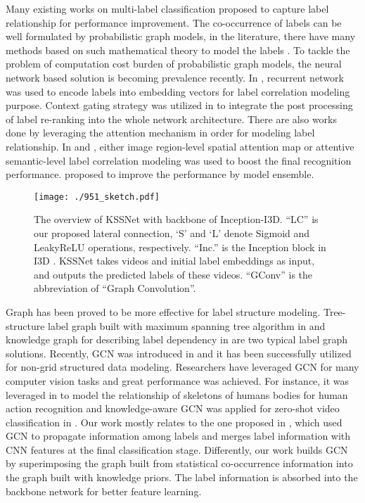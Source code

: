 \documentclass[letterpaper]{article} \usepackage{aaai20}  \usepackage{times}  \usepackage{helvet} \usepackage{courier}  \usepackage[hyphens]{url}  \usepackage{graphicx} \usepackage{subfigure}
\begin{document}
Many existing works on multi-label classification proposed to capture label relationship for performance improvement.
The co-occurrence of labels can be well formulated by probabilistic graph models, in the literature, there have many methods based on such mathematical theory to model the labels \cite{li2016conditional,li2014multi}. To tackle the problem of computation cost burden of probabilistic graph models, the neural network based solution is becoming prevalence recently.
In \cite{wang2016cnn}, recurrent network was used to encode labels into embedding vectors for label correlation modeling purpose. Context gating strategy was utilized in \cite{lin2018nextvlad} to integrate the post processing of label re-ranking into the whole network architecture. There are also works done by leveraging the attention mechanism in order for modeling label relationship. In \cite{wang2017multi} and \cite{zhu2017learning}, either image region-level spatial attention map or attentive semantic-level label correlation modeling was used to boost the final recognition performance. \cite{wang2019baseline} proposed to improve the performance by model ensemble.

\begin{figure*}[!t]
	\centering
	\texttt{[image: ./951\_sketch.pdf]}
	\caption{The overview of KSSNet with backbone of Inception-I3D. ``LC'' is our proposed lateral connection, `S' and `L' denote Sigmoid and LeakyReLU operations, respectively. ``Inc.'' is the Inception block in I3D \cite{carreira2017quo}. KSSNet takes videos and initial label embeddings as input, and outputs the predicted labels of these videos. ``GConv'' is the abbreviation of ``Graph Convolution''.}
	\label{sketch}
  \end{figure*}
Graph has been proved to be more effective for label structure modeling. Tree-structure label graph built with maximum spanning tree algorithm in \cite{li2014multi} and knowledge graph for describing label dependency in \cite{lee2018multi} are two typical label graph solutions. Recently, GCN was introduced in \cite{kipf2016semi} and it has been successfully utilized for non-grid structured data modeling. Researchers have leveraged GCN for many computer vision tasks and great performance was achieved. For instance, it was leveraged in \cite{yan2018spatial,gao2018generalized} to model the relationship of skeletons of humans bodies for human action recognition and knowledge-aware GCN was applied for zero-shot video classification in \cite{gao2019know}. Our work mostly relates to the one proposed in \cite{chen2019multi}, which used GCN to propagate information among labels and merges label information with CNN features at the final classification stage. Differently, our work builds GCN by superimposing the graph built from statistical co-occurrence information into the graph built with knowledge priors. The label information is absorbed into the backbone network for better feature learning. 
\end{document}
